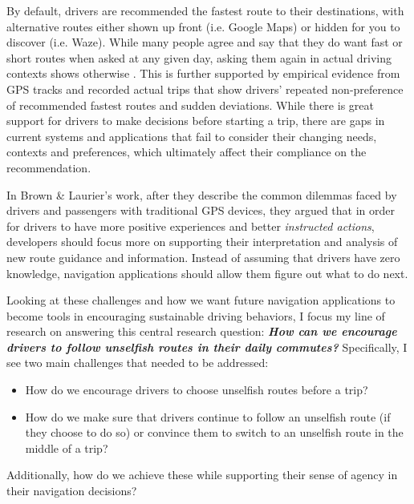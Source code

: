 By default, drivers are recommended the fastest route to their destinations, with alternative routes either shown up front (i.e. Google Maps) or hidden for you to discover (i.e. Waze). While many people agree and say that they do want fast or short routes when asked at any given day, asking them again in actual driving contexts shows otherwise \cite{Pfleging2014ExperienceNavigation}. This is further supported by empirical evidence from GPS tracks and recorded actual trips that show drivers' repeated non-preference of recommended fastest routes \cite{Quercia2014, Zhu2015DoPrinciple,Tang2016AnalyzingData} and sudden deviations\cite{Fujino2018DetectingTracks,Brown2012TheGPS,Samson:2019:EFI:3290605.3300601}. While there is great support for drivers to make decisions before starting a trip, there are gaps in current systems and applications that fail to consider their changing needs, contexts and preferences, which ultimately affect their compliance on the recommendation.

In Brown \& Laurier's work\cite{Brown2012TheGPS}, after they describe the common dilemmas faced by drivers and passengers with traditional GPS devices, they argued that in order for drivers to have more positive experiences and better \textit{instructed actions}, developers should focus more on supporting their interpretation and analysis of new route guidance and information. Instead of assuming that drivers have zero knowledge, navigation applications should allow them figure out what to do next.

Looking at these challenges and how we want future navigation applications to become tools in encouraging sustainable driving behaviors, I focus my line of research on answering this central research question: \textbf{\textit{How can we encourage drivers to follow unselfish routes in their daily commutes?}} Specifically, I see two main challenges that needed to be addressed:
\begin{itemize}
    \item How do we encourage drivers to choose unselfish routes before a trip?
    \item How do we make sure that drivers continue to follow an unselfish route (if they choose to do so) or convince them to switch to an unselfish route in the middle of a trip?
\end{itemize}

Additionally, how do we achieve these while supporting their sense of agency in their navigation decisions?

